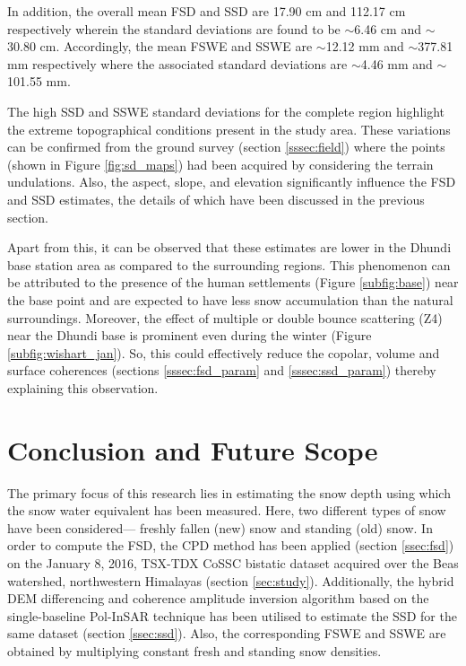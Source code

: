 \documentclass[review]{elsarticle}
\numberwithin{equation}{section}
\numberwithin{figure}{section}
\numberwithin{table}{section}
\begin{document}
In addition, the overall mean FSD and SSD are 17.90 cm and 112.17 cm respectively wherein the standard deviations are found to be $\sim$6.46 cm and $\sim$30.80 cm. Accordingly, the mean FSWE and SSWE are $\sim$12.12 mm and $\sim$377.81 mm respectively where the associated standard deviations are $\sim$4.46 mm and $\sim$101.55 mm. 

The high SSD and SSWE standard deviations for the complete region highlight the extreme topographical conditions present in the study area. These variations can be confirmed from the ground survey (section \ref{sssec:field}) where the points (shown in Figure \ref{fig:sd_maps}) had been acquired by considering the terrain undulations. Also, the aspect, slope, and elevation significantly influence the FSD and SSD estimates, the details of which have been discussed in the previous section.

Apart from this, it can be observed that these estimates are lower in the Dhundi base station area as compared to the surrounding regions. This phenomenon can be attributed to the presence of the human settlements (Figure \ref{subfig:base}) near the base point and are expected to have less snow accumulation than the natural surroundings. Moreover, the effect of multiple or double bounce scattering (Z4) near the Dhundi base is prominent even during the winter (Figure \ref{subfig:wishart_jan}). So, this could effectively reduce the copolar, volume and surface coherences (sections \ref{sssec:fsd_param} and \ref{sssec:ssd_param}) thereby explaining this observation.

\section{Conclusion and Future Scope}
\label{sec:conc}

The primary focus of this research lies in estimating the snow depth using which the snow water equivalent has been measured. Here, two different types of snow have been considered— freshly fallen (new) snow and standing (old) snow. In order to compute the FSD, the CPD method has been applied (section \ref{ssec:fsd}) on the January 8, 2016, TSX-TDX CoSSC bistatic dataset acquired over the Beas watershed, northwestern Himalayas (section \ref{sec:study}). Additionally, the hybrid DEM differencing and coherence amplitude inversion algorithm based on the single-baseline Pol-InSAR technique has been utilised to estimate the SSD for the same dataset (section \ref{ssec:ssd}). Also, the corresponding FSWE and SSWE are
obtained by multiplying constant fresh and standing snow densities.
\end{document}
